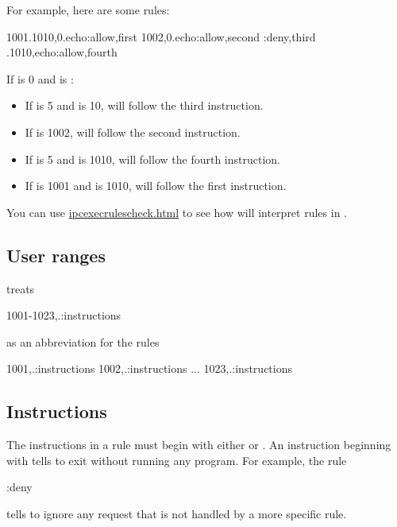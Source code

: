 \documentclass{book}
\begin{document}
For example, here are some rules:
\begin{code}%
  1001.1010,0.echo:allow,first
  1002,0.echo:allow,second
  :deny,third
  .1010,echo:allow,fourth
\end{code}

If  is 0 and  is :
\begin{itemize}
\item
If  is 5 and  is 10,
 will follow the third instruction.

\item
If  is 1002,  will follow the
second instruction.

\item
If  is 5 and  is 1010,
 will follow the fourth instruction.

\item
If  is 1001 and  is 1010,
 will follow the first instruction.
\end{itemize}

You can use \href{\cmd{ipcexecrulescheck}}{ipcexecrulescheck.html} to see how
 will interpret rules in .

\subsection{User ranges}
 treats
\begin{code}%
  1001-1023,.:instructions
\end{code}
as an abbreviation for the rules
\begin{code}%
  1001,.:instructions
  1002,.:instructions
  ...
  1023,.:instructions
\end{code}

\subsection{Instructions}
The instructions in a rule must begin with either  or .  An
instruction beginning with  tells  to exit without
running any program.  For example, the rule
\begin{code}%
  :deny
\end{code}
tells  to ignore any request that is not handled by a more specific
rule.
\end{document}
